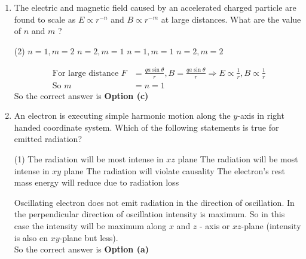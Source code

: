\begin{enumerate}
	{}
	\begin{tasks}(4)
		\task[\textbf{a.}]$\frac{\partial \lambda}{\partial t}$
		\task[\textbf{b.}]$-\frac{\partial \lambda}{\partial t}$
		\task[\textbf{c.}] $\frac{1}{2} \frac{\partial \lambda}{\partial t}$
		\task[\textbf{d.}]  $-\frac{1}{2} \frac{\partial \lambda}{\partial t}$
	\end{tasks}
\begin{answer}
	\begin{align*}
	\intertext{Consider Gauge Transformation}
	\vec{A}^{\prime}=\vec{A}-\vec{\nabla} \lambda=\vec{A}+\vec{\nabla}(-\lambda) \quad \text { and } \quad \Phi^{\prime}=\Phi-\frac{\partial(-\lambda)}{\partial t}=\Phi+\frac{\partial \lambda}{\partial t}
	\end{align*}
		So the correct answer is \textbf{Option (a)}
\end{answer}
	\item  The electric and magnetic field caused by an accelerated charged particle are found to scale as $E \propto r^{-n}$ and $B \propto r^{-m}$ at large distances. What are the value of $n$ and $m$ ?
	{}
	\begin{tasks}(2)
		\task[\textbf{a.}]$n=1, m=2$
		\task[\textbf{b.}]$n=2, m=1$
		\task[\textbf{c.}]$n=1, m=1$
		\task[\textbf{d.}]$n=2, m=2$
	\end{tasks}
\begin{answer}
	\begin{align*}
	\text { For large distance } F&=\frac{q a \sin \theta}{r}, B=\frac{q a \sin \theta}{r} \Rightarrow E \propto \frac{1}{r}, B \propto \frac{1}{r}\\
	\text { So } m&=n=1
	\end{align*}
		So the correct answer is \textbf{Option (c)}
\end{answer}
	\item  An electron is executing simple harmonic motion along the $y$-axis in right handed coordinate system. Which of the following statements is true for emitted radiation?
	{}
	\begin{tasks}(1)
		\task[\textbf{a.}]The radiation will be most intense in $x z$ plane
		\task[\textbf{b.}] The radiation will be most intense in $x y$ plane
		\task[\textbf{c.}]The radiation will violate causality
		\task[\textbf{d.}] The electron's rest mass energy will reduce due to radiation loss
	\end{tasks}
\begin{answer}
Oscillating electron does not emit radiation in the direction of oscillation.
In the perpendicular direction of oscillation intensity is maximum.
So in this case the intensity will be maximum along $x$ and $z$ - axis or $x z$-plane (intensity is also en $x y$-plane but less).\\
	So the correct answer is \textbf{Option (a)}
\end{answer}
\end{enumerate}